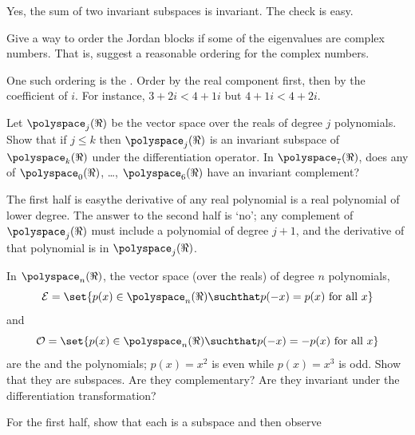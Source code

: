 \begin{exercises}
\begin{answer}
      Yes, the sum of two invariant subspaces is invariant.
      The check is easy.  
    \end{answer}
  \item  \label{exer:OrderC}
     Give a way to order the Jordan blocks if some of the eigenvalues
     are complex numbers.
     That is, suggest a reasonable ordering for the complex numbers.
     \begin{answer}
       One such ordering is the .
       Order by the real component first, then by the coefficient of \( i \).
       For instance, \( 3+2i<4+1i \) but \( 4+1i<4+2i \).  
     \end{answer}
  \item
    Let \( \polyspace_j(\Re) \) be the vector space over
    the reals of degree \( j \) polynomials.
    Show that if \( j\le k \) then \( \polyspace_j(\Re) \) is an invariant
    subspace of \( \polyspace_k(\Re) \) under the differentiation operator.
    In \( \polyspace_7(\Re) \), does any of \( \polyspace_0(\Re) \),
    \ldots, \( \polyspace_6(\Re) \) have an invariant complement?
    \begin{answer}
     The first half is easy\Dash the derivative of any real polynomial is
      a real polynomial of lower degree.
      The answer to the second half is `no'; any complement of
      \( \polyspace_j(\Re) \) must include a polynomial of degree \( j+1 \),
      and the derivative of that polynomial is in \( \polyspace_j(\Re)\).  
     \end{answer}
  \item
    In \( \polyspace_n(\Re) \), the vector space (over the
    reals) of degree \( n \) polynomials,
    \begin{equation*}
      \mathcal{E}=
      \set{p(x)\in\polyspace_n(\Re)\suchthat p(-x)=p(x) \text{\ for all\ }x}
    \end{equation*}
    and
    \begin{equation*}
      \mathcal{O}=
      \set{p(x)\in\polyspace_n(\Re)\suchthat p(-x)=-p(x) \text{\ for all\ }x}
    \end{equation*}
    are the  
    and the 
     polynomials; \( p(x)=x^2 \) is
    even while \( p(x)=x^3 \) is odd.
    Show that they are subspaces.
    Are they complementary?
    Are they invariant under the differentiation transformation?
    \begin{answer}
      For the first half, show that each is a subspace and then observe

\end{answer}
\end{exercises}
